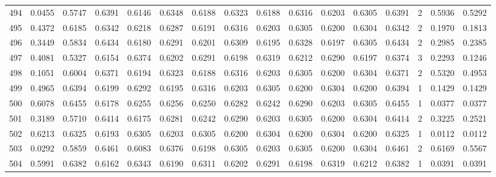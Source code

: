 \begin{tabular}{lrrrrrrrrrrrrrrr}
494 &      0.0455 &  0.5747 &  0.6391 &  0.6146 &  0.6348 &  0.6188 &  0.6323 &  0.6188 &  0.6316 &  0.6203 &   0.6305 &     0.6391 &      2 &                    0.5936 &                     0.5292 \\
495 &      0.4372 &  0.6185 &  0.6342 &  0.6218 &  0.6287 &  0.6191 &  0.6316 &  0.6203 &  0.6305 &  0.6200 &   0.6304 &     0.6342 &      2 &                    0.1970 &                     0.1813 \\
496 &      0.3449 &  0.5834 &  0.6434 &  0.6180 &  0.6291 &  0.6201 &  0.6309 &  0.6195 &  0.6328 &  0.6197 &   0.6305 &     0.6434 &      2 &                    0.2985 &                     0.2385 \\
497 &      0.4081 &  0.5327 &  0.6154 &  0.6374 &  0.6202 &  0.6291 &  0.6198 &  0.6319 &  0.6212 &  0.6290 &   0.6197 &     0.6374 &      3 &                    0.2293 &                     0.1246 \\
498 &      0.1051 &  0.6004 &  0.6371 &  0.6194 &  0.6323 &  0.6188 &  0.6316 &  0.6203 &  0.6305 &  0.6200 &   0.6304 &     0.6371 &      2 &                    0.5320 &                     0.4953 \\
499 &      0.4965 &  0.6394 &  0.6199 &  0.6292 &  0.6195 &  0.6316 &  0.6203 &  0.6305 &  0.6200 &  0.6304 &   0.6200 &     0.6394 &      1 &                    0.1429 &                     0.1429 \\
500 &      0.6078 &  0.6455 &  0.6178 &  0.6255 &  0.6256 &  0.6250 &  0.6282 &  0.6242 &  0.6290 &  0.6203 &   0.6305 &     0.6455 &      1 &                    0.0377 &                     0.0377 \\
501 &      0.3189 &  0.5710 &  0.6414 &  0.6175 &  0.6281 &  0.6242 &  0.6290 &  0.6203 &  0.6305 &  0.6200 &   0.6304 &     0.6414 &      2 &                    0.3225 &                     0.2521 \\
502 &      0.6213 &  0.6325 &  0.6193 &  0.6305 &  0.6203 &  0.6305 &  0.6200 &  0.6304 &  0.6200 &  0.6304 &   0.6200 &     0.6325 &      1 &                    0.0112 &                     0.0112 \\
503 &      0.0292 &  0.5859 &  0.6461 &  0.6083 &  0.6376 &  0.6198 &  0.6305 &  0.6203 &  0.6305 &  0.6200 &   0.6304 &     0.6461 &      2 &                    0.6169 &                     0.5567 \\
504 &      0.5991 &  0.6382 &  0.6162 &  0.6343 &  0.6190 &  0.6311 &  0.6202 &  0.6291 &  0.6198 &  0.6319 &   0.6212 &     0.6382 &      1 &                    0.0391 &                     0.0391 \\

\end{tabular}
